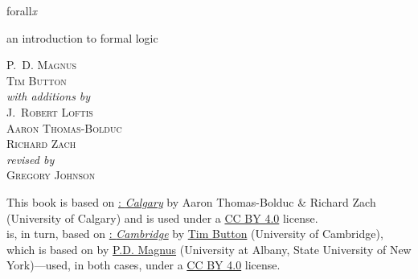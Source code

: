 

\pagestyle{empty}

\vspace*{80pt}

\begin{raggedleft}
\fontsize{34pt}{24pt}\sffamily
\selectfont
{forall\hspace{.08em}\fontsize{36pt}{24pt}\selectfont\rmfamily\textit{x}}

\smallskip\fontsize{16pt}{20pt}\sffamily\selectfont
\textcolor{maroon}{\uppercase{}}  

\bigskip\fontsize{16pt}{20pt}\selectfont

an introduction to formal logic

\vspace*{50pt}
\fontsize{10pt}{16pt}\selectfont \textsc{P.~D. Magnus}\\
\textsc{Tim Button}\\
\medskip
\textit{with additions by}\\
\textsc{J.~Robert Loftis}\\
\textsc{Aaron Thomas-Bolduc}\\ \textsc{Richard Zach}\\ 
\medskip
\textit{revised by}\\
\textsc{Gregory Johnson}

\vfill
\textcolor{maroon}{\forallxversion}\par
\end{raggedleft}


\newpage 


\noindent \small This book is based on \href{http://forallx.openlogicproject.org/}{\forallx:\emph{ Calgary}} by {Aaron Thomas-Bolduc \& Richard Zach} ({University of Calgary}) and is used under a \href{https://creativecommons.org/licenses/by/4.0/}{CC BY 4.0} license.\\[1ex] 

 is, in turn, based on \href{http://people.ds.cam.ac.uk/tecb2/forallx.shtml}{\forallx:\emph{ Cambridge}} by \href{http://people.ds.cam.ac.uk/tecb2/index.shtml}{Tim Button} ({University of Cambridge}), 
which is based on \href{https://www.fecundity.com/logic/}{\forallx} by \href{https://www.fecundity.com/job/}{P.D. Magnus} (University at Albany, State University of New York)---used, in both cases, under a \href{https://creativecommons.org/licenses/by/4.0/}{CC BY 4.0} license.\\[1ex]


